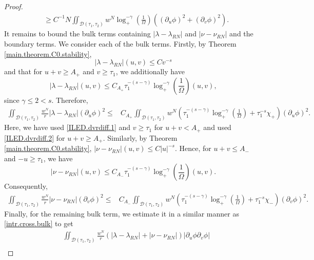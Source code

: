 \documentclass[10pt, reqno]{amsart}
\theoremstyle{definition}
\theoremstyle{remark}
\numberwithin{equation}{section}
\newcommand{\rd}{\partial}
\newcommand{\0}{\emptyset}
\newcommand{\gmm}{\gamma}
\newcommand{\lmb}{\lambda}
\newcommand{\Omg}{\Omega}
\newcommand{\calD}{\mathcal D}
\newcommand{\dur}{\nu}
\newcommand{\dvr}{\lmb}
\newcommand{\f}{\frac}
\begin{document}
\begin{proof}
\begin{equation}
\begin{split}
&\geq C^{-1}	N\iint_{\calD(\tau_{1}, \tau_{2})} w^{N} \log_+^{-\gamma}(\f 1{\Omg}) \left( (\rd_{u} \phi)^{2} + (\rd_{v} \phi)^{2} \right).
\end{split}
\end{equation}
It remains to bound the bulk terms containing $|\dvr-\dvr_{RN}|$ and $|\dur-\dur_{RN}|$ and the boundary terms. We consider each of the bulk terms. Firstly, by Theorem \ref{main.theorem.C0.stability},
\begin{equation}\label{ILED.dvrdiff.1}
|\lambda-\lambda_{RN}|(u,v)\leq C v^{-s}
\end{equation}
and that for $u+v\geq A_+$ and $v \geq \tau_{1}$, we additionally have
\begin{equation}\label{ILED.dvrdiff.2}
|\lambda-\lambda_{RN}|(u,v)\leq C_{A_+} \tau_{1}^{-(s - \gmm)} \log_+^{-\gmm}(\f 1{\Omg})(u,v),
\end{equation}
since $\gmm \leq 2 < s$.
Therefore,
\begin{equation}\label{intr.ILED.bulk.2}
\begin{split}
\iint_{\calD(\tau_{1}, \tau_{2})} \f{w^{N}}{r}  |\lambda-\lambda_{RN}|(\rd_{u} \phi)^{2} 
\leq &C_{A_+}\iint_{\calD(\tau_{1}, \tau_{2})} w^N (\tau_{1}^{-(s-\gmm)} \log_+^{-\gmm}(\f{1}{\Omg})+\tau_1^{-s}\chi_+) (\rd_{u} \phi)^{2} .
\end{split}
\end{equation}
Here, we have used \eqref{ILED.dvrdiff.1} and $v\geq \tau_1$ for $u+v< A_+$ and used \eqref{ILED.dvrdiff.2} for $u+v\geq A_+$.
Similarly, by Theorem \ref{main.theorem.C0.stability}, $|\nu-\nu_{RN}|(u,v)\leq C|u|^{-s}$. Hence, for $u+v\leq A_-$  and $-u \geq \tau_{1}$, we have
$$|\nu-\nu_{RN}|(u,v)\leq C_{A_-} \tau_{1}^{-(s- \gmm)} \log_+^{-\gmm}(\f 1{\Omg})(u,v).$$
Consequently,
\begin{equation}\label{intr.ILED.bulk.3}
\begin{split}
\iint_{\calD(\tau_{1}, \tau_{2})} \f{w^{N}}{r}  |\nu-\nu_{RN}|(\rd_{v} \phi)^{2} 
\leq &C_{A_-}\iint_{\calD(\tau_{1}, \tau_{2})} w^N (\tau_{1}^{-(s-\gmm)} \log_+^{-\gmm}(\f{1}{\Omg})+\tau_1^{-s}\chi_-) (\rd_{v} \phi)^{2} .
\end{split}
\end{equation}
Finally, for the remaining bulk term, we estimate it in a similar manner as \eqref{intr.cross.bulk} to get
\begin{equation}\label{intr.ILED.bulk.4}
\begin{split}
&\iint_{\calD(\tau_{1}, \tau_{2})} \f{w^{N}}{r}  (|\dvr-\dvr_{RN}|+|\nu-\nu_{RN}|) |\rd_{u} \phi \rd_{v} \phi| \\

\end{split}
\end{equation}
\end{proof}
\end{document}
